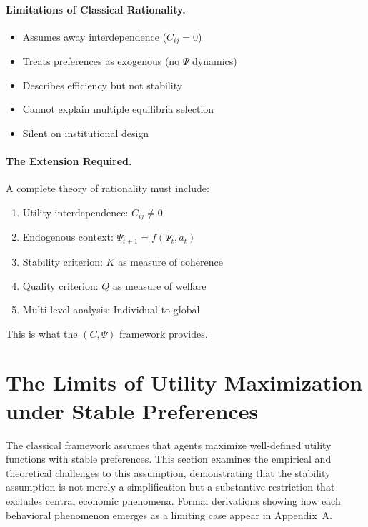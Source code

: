 \documentclass[12pt,a4paper]{article}
\begin{document}
\paragraph{Limitations of Classical Rationality.}
\begin{itemize}
  \item Assumes away interdependence ($C_{ij} = 0$)
  \item Treats preferences as exogenous (no $\Psi$ dynamics)
  \item Describes efficiency but not stability
  \item Cannot explain multiple equilibria selection
  \item Silent on institutional design
\end{itemize}

\paragraph{The Extension Required.}
A complete theory of rationality must include:
\begin{enumerate}
  \item Utility interdependence: $C_{ij} \neq 0$
  \item Endogenous context: $\Psi_{t+1} = f(\Psi_t, a_t)$
  \item Stability criterion: $K$ as measure of coherence
  \item Quality criterion: $Q$ as measure of welfare
  \item Multi-level analysis: Individual to global
\end{enumerate}

This is what the $(C, \Psi)$ framework provides.

\section{The Limits of Utility Maximization under Stable Preferences}
\label{sec:limitsutility}

The classical framework assumes that agents maximize well-defined utility functions
with stable preferences. This section examines the empirical and theoretical challenges
to this assumption, demonstrating that the stability assumption is not merely
a simplification but a substantive restriction that excludes central economic phenomena. Formal derivations showing how each behavioral phenomenon emerges as a limiting case appear in Appendix~A.
\end{document}
